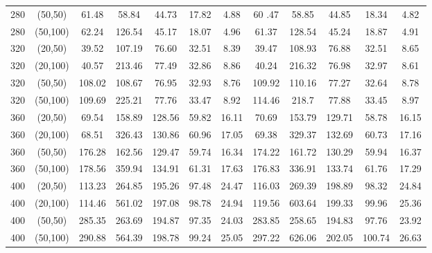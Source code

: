 \documentclass[12pt, eqno, limlimits]{article}
\begin{document}
\begin{sloppypar}
\begin{table}[htpb]
\begin{center}
\begin{tabular}{cccccccccccc}
                    280 & (50,50)  & 61.48 & 58.84 & 44.73 & 17.82 & 4.88 & 60 .47 & 58.85 & 44.85 & 18.34 & 4.82    \\ 
                    280 & (50,100) & 62.24 & 126.54	& 45.17	& 18.07	& 4.96 & 61.37 & 128.54	& 45.24	& 18.87	& 4.91   \\ 
                    320 & (20,50)  & 39.52 & 107.19	& 76.60 & 32.51	& 8.39 & 39.47 & 108.93	& 76.88	& 32.51 & 8.65    \\ 
                    320 & (20,100) & 40.57 & 213.46	& 77.49	& 32.86	& 8.86 & 40.24 & 216.32	& 76.98 & 32.97 & 8.61    \\ 
                    320 & (50,50)  & 108.02 & 108.67 & 76.95 & 32.93 & 8.76	& 109.92 & 110.16 &	77.27 &	32.64 & 8.78  \\ 
                    320 & (50,100) & 109.69 & 225.21 & 77.76 & 33.47 & 8.92 & 114.46 & 218.7 & 77.88 & 33.45 & 8.97   \\ 
                    360 & (20,50)  & 69.54 & 158.89 & 128.56 & 59.82 & 16.11 & 70.69 & 153.79 &	129.71 & 58.78 & 16.15  \\		
                    360 & (20,100) & 68.51 & 326.43	& 130.86 & 60.96 & 17.05 & 69.38 & 329.37 &	132.69 & 60.73 & 17.16  \\ 
                    360 & (50,50)  & 176.28 & 162.56 & 129.47 & 59.74 &	16.34 &	174.22 & 161.72	& 130.29 & 59.94 & 16.37  \\ 
                    360 & (50,100) & 178.56	& 359.94 & 134.91 &	61.31 &	17.63 &	176.83 & 336.91	& 133.74 & 61.76 & 17.29  \\ 
                    400 & (20,50)  & 113.23 & 264.85 & 195.26 & 97.48 & 24.47 & 116.03 & 269.39 & 198.89 & 98.32 & 24.84   \\ 
                    400 & (20,100) & 114.46 & 561.02 & 197.08 & 98.78 & 24.94 & 119.56 & 603.64 & 199.33 & 99.96 & 25.36    \\ 
                    400 & (50,50)  & 285.35 & 263.69 & 194.87 &	97.35 &	24.03 &	283.85 & 258.65	& 194.83 & 97.76 & 23.92   \\ 
                    400 & (50,100) & 290.88	& 564.39 & 198.78 &	99.24 &	25.05 &	297.22 & 626.06	& 202.05 & 100.74 & 26.63  \\ \hline 	
                \end{tabular}
            \end{center} 
        \end{table}
        

\end{sloppypar}
\end{document}
